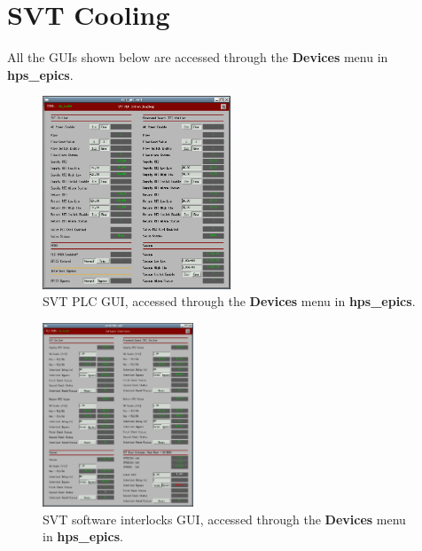 \section{SVT Cooling}

All the GUIs shown below are accessed through the \textbf{Devices} menu in \textbf{hps\_epics}.

\begin{figure}[!ht]
    \begin{center}
        \includegraphics[width=0.5\textwidth]{svt_plc.png}
        \caption{SVT PLC GUI, accessed through the \textbf{Devices} menu in \textbf{hps\_epics}.}
        \label{fig:ctrl_cooling_plc}
    \end{center}
\end{figure}

\begin{figure}[!ht]
    \begin{center}
        \includegraphics[width=0.4\textwidth]{svt_softinterlocks.png}
        \caption{SVT software interlocks GUI, accessed through the \textbf{Devices} menu in \textbf{hps\_epics}.}
        \label{fig:ctrl_cooling_softinterlocks}
    \end{center}
\end{figure}

